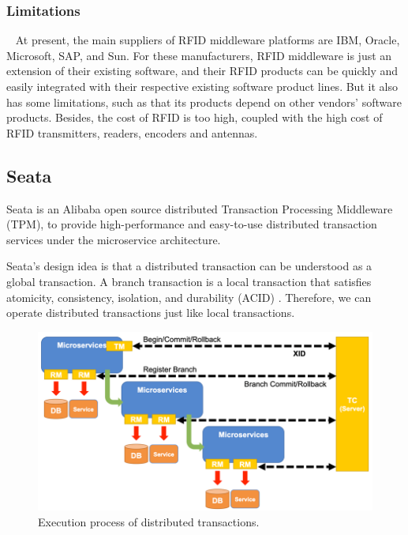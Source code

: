 \documentclass[conference]{IEEEtran}
\begin{document}
\subsubsection{Limitations}
\
\newline
\indent
 At present, the main suppliers of RFID middleware platforms are IBM, Oracle, Microsoft, SAP, and Sun. For these manufacturers, RFID middleware is just an extension of their existing software, and their RFID products can be quickly and easily integrated with their respective existing software product lines. But it also has some limitations, such as that its products depend on other vendors' software products. Besides, the cost of RFID is too high, coupled with the high cost of RFID transmitters, readers, encoders and antennas.
 
 
 \subsection{Seata}

Seata is an Alibaba open source distributed Transaction Processing Middleware (TPM), to provide high-performance and easy-to-use distributed transaction services under the microservice architecture.

Seata's design idea is that a distributed transaction can be understood as a global transaction. A branch transaction is a local transaction that satisfies atomicity, consistency, isolation, and durability (ACID) \cite{b11}. Therefore, we can operate distributed transactions just like local transactions.



\begin{figure}[h]
\centering
\includegraphics[width=1\columnwidth]{seata}
\caption{Execution process of distributed transactions.}
\label{fig}
\end{figure}
\end{document}
